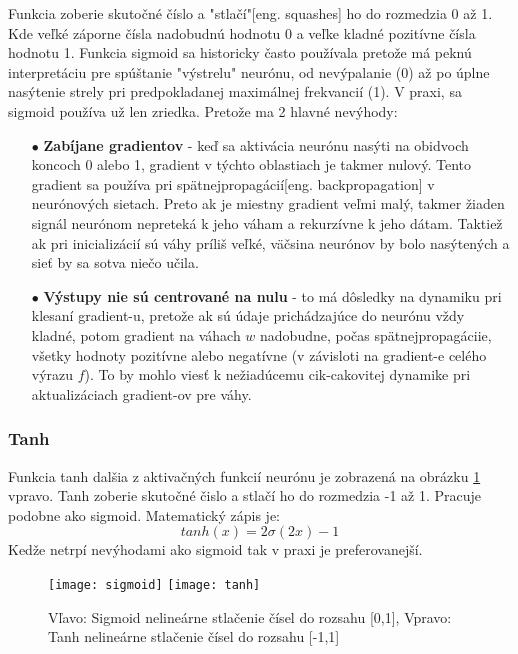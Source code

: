 Funkcia zoberie skutočné číslo a "stlačí"[eng. squashes] ho do rozmedzia 0 až 1.
Kde veľké záporne čísla nadobudnú hodnotu 0 a veľke kladné pozitívne čísla hodnotu 1.
Funkcia sigmoid sa historicky často používala pretože má peknú interpretáciu pre spúštanie "výstrelu" neurónu,
    od nevýpalanie (0) až po úplne nasýtenie strely pri predpokladanej maximálnej frekvancií (1).
V praxi, sa sigmoid používa už len zriedka.
Pretože ma 2 hlavné nevýhody\cite{odkaz:ConvolutionalNeuralNetworkCS231n}:
\begin{enumerate}
    \item[$\bullet$] \textbf{Zabíjane gradientov} - keď sa aktivácia neurónu nasýti na obidvoch koncoch 0 alebo 1, gradient v týchto oblastiach je takmer nulový.
    Tento gradient sa používa pri spätnejpropagácií[eng. backpropagation] v neurónových sietach. Preto ak je miestny gradient veľmi malý, takmer žiaden signál
    neurónom nepreteká k jeho váham a rekurzívne k jeho dátam. Taktiež ak pri inicializácií sú váhy príliš veľké, väčsina neurónov by bolo nasýtených a sieť by sa sotva niečo učila.
    \item[$\bullet$] \textbf{Výstupy nie sú centrované na nulu} - to má dôsledky na dynamiku pri klesaní gradient-u, pretože ak sú údaje prichádzajúce do neurónu vždy kladné,
    potom gradient na váhach $w$ nadobudne, počas spätnejpropagáciie, všetky hodnoty pozitívne alebo negatívne (v závisloti na gradient-e celého výrazu $f$).
    To by mohlo viesť k nežiadúcemu cik-cakovitej dynamike pri aktualizáciach gradient-ov pre váhy.
\end{enumerate}


\subsubsection{Tanh}
Funkcia tanh dalšia z aktivačných funkcií neurónu je zobrazená na obrázku \ref{pic:ActivationFunctions} vpravo.
Tanh zoberie skutočné čislo a stlačí ho do rozmedzia -1 až 1. Pracuje podobne ako sigmoid.
Matematický zápis je\cite{odkaz:ConvolutionalNeuralNetworkCS231n}:
\begin{equation}
    tanh(x) = 2\sigma(2x) - 1
\end{equation}
Kedže netrpí nevýhodami ako sigmoid tak v praxi je preferovanejší.


\begin{figure}[H]
    \centering
    \texttt{[image: sigmoid]}
    \qquad
    \texttt{[image: tanh]}
    \caption{
        Vľavo: Sigmoid nelineárne stlačenie čísel do rozsahu [0,1],
        Vpravo: Tanh nelineárne stlačenie čísel do rozsahu [-1,1] \cite{odkaz:ConvolutionalNeuralNetworkCS231n}
    }
    \label{pic:ActivationFunctions}
\end{figure}

